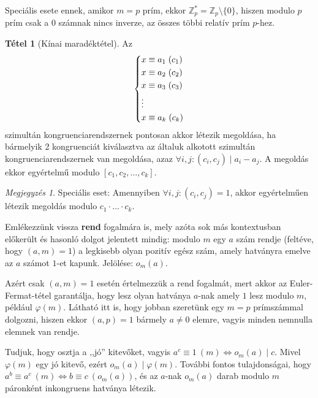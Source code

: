 \documentclass[12pt]{book}
\theoremstyle{plain} %
\theoremstyle{definition} %
\newtheorem{theo/}{Tétel}[section]
\newenvironment{theo}
  {\renewcommand{\qedsymbol}{$\clubsuit$}%
   \pushQED{\qed}\begin{theo/}}
  {\popQED\end{theo/}}
\theoremstyle{remark}
\newtheorem*{mj}{Megjegyzés}
\renewcommand\qedsymbol{$\blacksquare$}
\numberwithin{equation}{section}  %
\begin{document}
	Speciális esete ennek, amikor $m=p$ prím, ekkor $\mathbb{Z}_p^{*} = \mathbb{Z}_p \setminus \{0\} $, hiszen modulo $p$ prím csak a $0$ számnak nincs inverze, az összes többi relatív prím $p$-hez. 
	
	\begin{theo}[Kínai maradéktétel]
		Az
		\[
		\begin{cases*}
		x \equiv a_1 \hspace{1mm} (c_1) \\
		x \equiv a_2 \hspace{1mm} (c_2) \\
		x \equiv a_3 \hspace{1mm} (c_3) \\
		\vdots \\
		x \equiv a_k \hspace{1mm} (c_k) \\
		\end{cases*}
		\]
		szimultán kongruenciarendszernek pontosan akkor létezik megoldása, ha bármelyik 2 kongruenciát kiválasztva az általuk alkotott szimultán kongruenciarendszernek van megoldása, azaz $\forall i,j\colon (c_i,c_j)\mid a_i-a_j$. A megoldás ekkor egyértelmű modulo $[c_1,c_2,\ldots, c_k]$.
	\end{theo}

	\begin{mj}
		Speciális eset: Amennyiben $\forall i,j\colon (c_i,c_j)=1$, akkor egyértelműen létezik megoldás modulo $c_1\cdot \ldots \cdot c_k$.
	\end{mj}
	
	Emlékezzünk vissza \textbf{rend} fogalmára is, mely azóta sok más kontextusban előkerült és hasonló dolgot jelentett mindig: modulo $m$ egy $a$ szám rendje (feltéve, hogy $(a,m)=1$) a legkisebb olyan pozitív egész szám, amely hatványra emelve az $a$ számot $1$-et kapunk. Jelölése: $o_m(a)$.
	
	Azért csak $(a,m)=1$ esetén értelmezzük a rend fogalmát, mert akkor az Euler-Fermat-tétel garantálja, hogy lesz olyan hatványa $a$-nak amely $1$ lesz modulo $m$, például $\varphi(m)$. Látható itt is, hogy jobban szeretünk egy $m=p$ prímszámmal dolgozni, hiszen ekkor $(a,p)=1$ bármely $a\neq 0$ elemre, vagyis minden nemnulla elemnek van rendje.
	
	Tudjuk, hogy osztja a ,,jó'' kitevőket, vagyis $a^c \equiv 1 \ (m) \Leftrightarrow o_m(a)\mid c$. Mivel $\varphi(m)$ egy jó kitevő, ezért $o_m(a)\mid \varphi(m)$. További fontos tulajdonságai, hogy $a^b\equiv a^c\ (m) \Leftrightarrow b\equiv c \ (o_m(a))$, és az $a$-nak $o_m(a)$ darab modulo $m$ páronként inkongruens hatványa létezik.
	
\end{document}
